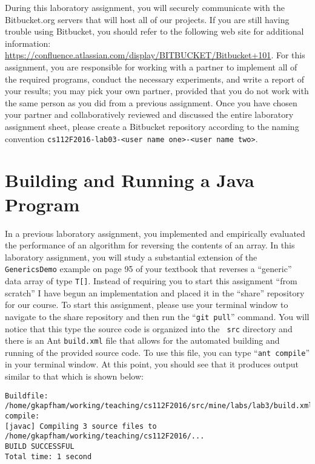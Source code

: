 During this laboratory assignment, you will securely communicate with the Bitbucket.org servers that will host all of
our projects.  If you are still having trouble using Bitbucket, you should refer to the following web site for
additional information: \url{https://confluence.atlassian.com/display/BITBUCKET/Bitbucket+101}.  For this assignment,
you are responsible for working with a partner to implement all of the required programs, conduct the necessary
experiments, and write a report of your results; you may pick your own partner, provided that you do not work with the
same person as you did from a previous assignment. Once you have chosen your partner and collaboratively reviewed and
discussed the entire laboratory assignment sheet, please create a Bitbucket repository according to the naming
convention {\tt cs112F2016-lab03-<user name one>-<user name two>}.

\section*{Building and Running a Java Program}

In a previous laboratory assignment, you implemented and empirically evaluated the performance of an algorithm for
reversing the contents of an array. In this laboratory assignment, you will study a substantial extension of the {\tt
GenericsDemo} example on page 95 of your textbook that reverses a ``generic'' data array of type {\tt T[]}. Instead of
requiring you to start this assignment ``from scratch'' I have begun an implementation and placed it in the ``share''
repository for our course. To start this assignment, please use your terminal window to navigate to the share repository
and then run the ``{\tt git pull}'' command. You will notice that this type the source code is organized into the {\tt
src} directory and there is an Ant {\tt build.xml} file that allows for the automated building and running of the
provided source code. To use this file, you can type ``{\tt ant compile}'' in your terminal window. At this point, you
should see that it produces output similar to that which is shown below:

\begin{verbatim}
Buildfile: /home/gkapfham/working/teaching/cs112F2016/src/mine/labs/lab3/build.xml
compile:
[javac] Compiling 3 source files to /home/gkapfham/working/teaching/cs112F2016/...
BUILD SUCCESSFUL
Total time: 1 second
\end{verbatim}

\vspace*{-.1in}

